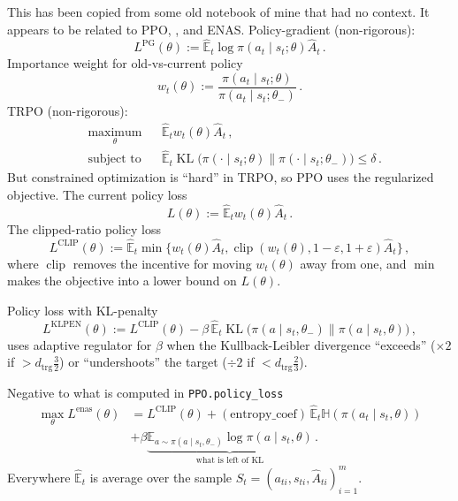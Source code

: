 \documentclass[acmsmall, nonacm]{acmart}
\begin{document}
This has been copied from some old notebook of mine that had no context. It appears to be
related to PPO, \citep{schulman_proximal_2017}, and ENAS.
%
Policy-gradient (non-rigorous):
$$
L^\text{PG}(\theta)
    := \hat{\mathbb{E}}_t
        \log \pi(a_t\mid s_t; \theta) \widehat{A}_t
    \,. $$
Importance weight for old-vs-current policy
$$
w_t(\theta)
    := \frac{\pi(a_t \mid s_t; \theta)}{\pi(a_t \mid s_t; \theta_-)}
\,. $$
TRPO (non-rigorous):
$$
\begin{aligned}
    &\underset{\theta}{\text{maximum}}
      & &
        \hat{\mathbb{E}}_t w_t(\theta) \widehat{A}_t
        \,, \\
    & \text{subject to}
      & & \hat{\mathbb{E}}_t
        \operatorname{KL}\bigl(
            \pi(\cdot \mid s_t; \theta)
            \| \pi(\cdot \mid s_t; \theta_-)
        \bigr) \leq \delta
    \,.
\end{aligned}
    $$
But constrained optimization is ``hard'' in TRPO, so PPO uses the regularized objective.
% 
The current policy loss
$$
L(\theta)
    := \hat{\mathbb{E}}_t w_t(\theta) \widehat{A}_t
    \,. $$
The clipped-ratio policy loss
$$
L^\text{CLIP}(\theta)
    := \hat{\mathbb{E}}_t \min\bigl\{
        w_t(\theta) \widehat{A}_t,
        \operatorname{clip}(w_t(\theta), 1 - \varepsilon, 1 + \varepsilon) \widehat{A}_t
    \bigr\}
    \,, $$
where $\operatorname{clip}$ removes the incentive for moving $w_t(\theta)$ away from one,
and $\min$ makes the objective into a lower bound on $L(\theta)$.

Policy loss with KL-penalty
$$
L^\text{KLPEN}(\theta)
    := L^\text{CLIP}(\theta)
    - \beta \, \hat{\mathbb{E}}_t
        \operatorname{KL}\bigl(
            \pi(a \mid s_t, \theta_-)
            \| \pi(a \mid s_t, \theta)
        \bigr)
    \,, $$
uses adaptive regulator for $\beta$ when the Kullback-Leibler divergence ``exceeds''
($\times 2$ if $> d_\text{trg} \frac32$) or ``undershoots'' the target ($\div 2$
if $< d_\text{trg} \frac23$).

Negative to what is computed in \texttt{PPO.policy\_loss}
\begin{align}
\max_\theta L^\text{enas}(\theta)
    &= L^\text{CLIP}(\theta)
        + (\mathrm{entropy\_coef})\, \hat{\mathbb{E}}_t \mathbb{H}(\pi(a_t\mid s_t, \theta))
    \\
        &+ \beta \underbrace{
            \mathbb{E}_{a\sim \pi(a \mid s_t, \theta_-)} \log \pi(a \mid s_t, \theta)
        }_{\text{what is left of KL}}
    \,.
\end{align}
Everywhere $\hat{\mathbb{E}}_t$ is average over the sample $
    S_t = (a_{ti}, s_{ti}, \widehat{A}_{ti})_{i=1}^m
$.




\end{document}
